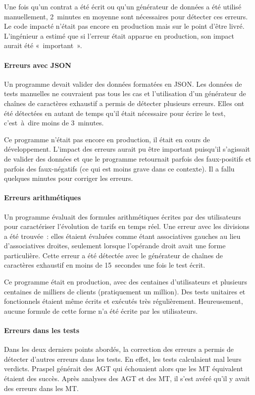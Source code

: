 Une fois qu'un contrat a été écrit ou qu'un générateur de données a été utilisé
manuellement, 2~minutes en moyenne sont nécessaires pour détecter ces erreurs.
Le code impacté n'était pas encore en production mais sur le point d'être livré.
L'ingénieur a estimé que si l'erreur était apparue en production, son impact
aurait été «~important~».

\paragraph{Erreurs avec JSON} Un programme devait valider des données formatées
en JSON. Les données de tests manuelles ne couvraient pas tous les cas et
l'utilisation d'un générateur de chaînes de caractères exhaustif a permis de
détecter plusieurs erreurs. Elles ont été détectées en autant de temps qu'il
était nécessaire pour écrire le test, c'est~à~dire moins de 3~minutes. 

Ce programme n'était pas encore en production, il était en cours de
développement. L'impact des erreurs aurait pu être important puisqu'il
s'agissait de valider des données et que le programme retournait parfois des
faux-positifs et parfois des faux-négatifs (ce qui est moins grave dans ce
contexte). Il a fallu quelques minutes pour corriger les erreurs.

\paragraph{Erreurs arithmétiques} Un programme évaluait des formules
arithmétiques écrites par des utilisateurs pour caractériser l'évolution de
tarifs en temps réel. Une erreur avec les divisions a été trouvée~: elles
étaient évaluées comme étant associatives gauches au lieu d'associatives
droites, seulement lorsque l'opérande droit avait une forme particulière. Cette
erreur a été détectée avec le générateur de chaînes de caractères exhaustif en
moins de 15~secondes une fois le test écrit.

Ce programme était en production, avec des centaines d'utilisateurs et plusieurs
centaines de milliers de clients (pratiquement un million). Des tests unitaires
et fonctionnels étaient même écrits et exécutés très régulièrement.
Heureusement, aucune formule de cette forme n'a été écrite par les utilisateurs.

\paragraph{Erreurs dans les tests} Dans les deux derniers points abordés, la
correction des erreurs a permis de détecter d'autres erreurs dans les tests. En
effet, les tests calculaient mal leurs verdicts. Praspel générait des AGT qui
échouaient alors que les MT équivalent étaient des succès. Après analyses des
AGT et des MT, il s'est avéré qu'il y avait des erreurs dans les MT.


